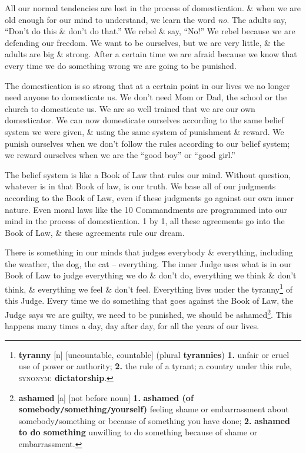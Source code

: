 \documentclass[oneside]{book}
\numberwithin{equation}{section}
\begin{document}
All our normal tendencies are lost in the process of domestication. \& when we are old enough for our mind to understand, we learn  the word \textit{no}. The adults say, ``Don't do this \& don't do that.'' We rebel \& say, ``No!'' We rebel because we are defending our freedom. We want to be ourselves, but we are very little, \& the adults are big \& strong. After a certain time we are afraid because we know that every time we do something wrong we are going to be punished.

The domestication is so strong that at a certain point in our lives we no longer need anyone to domesticate us. We don't need Mom or Dad, the school or the church to domesticate us. We are so well trained that we are our own domesticator.  We can now domesticate ourselves according to the same belief system we were given, \& using the same system of punishment \& reward. We punish ourselves when we don't follow the rules according to our belief system; we reward ourselves when we are the ``good boy'' or ``good girl.''

The belief system is like a Book of Law that rules our mind. Without question, whatever is in that Book of law, is our truth. We base all of our judgments according to the Book of Law, even if these judgments go against our own inner nature. Even moral laws like the 10 Commandments are programmed into our mind in the process of domestication. 1 by 1, all these agreements go into the Book of Law, \& these agreements rule our dream.

There is something in our minds that judges everybody \& everything, including the weather, the dog, the cat -- everything. The inner Judge uses what is in our Book of Law to judge everything we do \& don't do, everything we think \& don't think, \& everything we feel \& don't feel. Everything lives under the tyranny\footnote{\textbf{tyranny} [n] [uncountable, countable] (plural \textbf{tyrannies}) \textbf{1.} unfair or cruel use of power or authority; \textbf{2.} the rule of a tyrant; a country under this rule, \textsc{synonym}: \textbf{dictatorship}.} of this Judge. Every time we do something that goes against the Book of Law, the Judge says we are guilty, we need to be punished, we should be ashamed\footnote{\textbf{ashamed} [a] [not before noun] \textbf{1.} \textbf{ashamed (of somebody\texttt{/}something\texttt{/}yourself)} feeling shame or embarrassment about somebody\texttt{/}something or because of something you have done; \textbf{2.} \textbf{ashamed to do something} unwilling to do something because of shame or embarrassment.}. This happens many times a day, day after day, for all the years of our lives.
\end{document}
